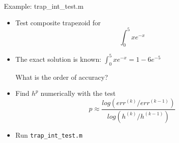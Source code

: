 \documentclass[10pt]{beamer}
\begin{document}
\begin{frame}{Example: trap\_int\_test.m}

\begin{itemize}
    \item Test composite trapezoid for
        \begin{equation*}
          \int_0^5 x e^{-x}
        \end{equation*}

    \item The exact solution is known: $\int_0^5 x e^{-x} = 1- 6e^{-5}$

    \begin{alertblock}{}
    What is the order of accuracy?      
    \end{alertblock}
    \bigskip

    \item Find $h^p$ numerically with the test 
        \begin{equation*}
          p \approx \frac{log(err^{(k)}/err^{(k-1)})}{log(h^{(k)}/h^{(k-1)})}
        \end{equation*}
        
    \item Run \texttt{trap\_int\_test.m}
\end{itemize}
\end{frame}

\end{document}
